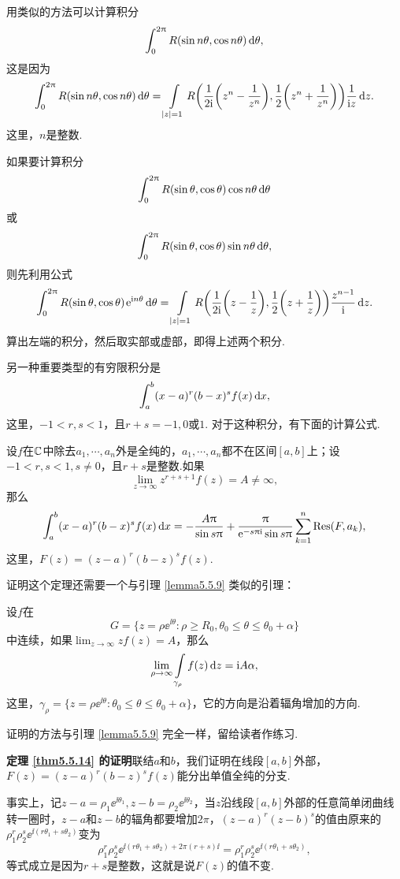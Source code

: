 用类似的方法可以计算积分
\[
  \int_0^{2\uppi}R(\sin n\theta,\cos n\theta)\mathop{}\!\mathrm{d} \theta,
\]
这是因为
\[
  \int_0^{2\uppi}R(\sin n\theta,\cos n\theta)\mathop{}\!\mathrm{d} \theta=
  \int\limits_{|z|=1}R\bigg(\frac1{2\mathrm i}\bigg(z^n-\frac1{z^n}\bigg),
  \frac12\bigg(z^n+\frac1{z^n}\bigg)\bigg)\frac1{\mathrm i z}\mathop{}\!\mathrm dz.
\]
这里，$n$是整数.

如果要计算积分
\[
  \int_0^{2\uppi}R(\sin \theta,\cos \theta)\cos n\theta\mathop{}\!\mathrm{d} \theta
\]
或
\[
  \int_0^{2\uppi}R(\sin \theta,\cos \theta)\sin n\theta\mathop{}\!\mathrm{d} \theta,
\]
则先利用公式
\begin{equation}\label{eq5.5.10}
  \int_0^{2\uppi}R(\sin\theta,\cos\theta)\operatorname{\!\!\;\mathrm e}^{\mathrm i n\theta}\mathop{}\!\mathrm{d} \theta =
  \int\limits_{|z|=1}R\bigg(\frac1{2\mathrm i}\bigg(z-\frac1z\bigg),
  \frac12\bigg(z+\frac1z\bigg)\bigg)\frac{z^{n-1}}{\mathrm i}\mathop{}\!\mathrm dz.
\end{equation}
算出左端的积分，然后取实部或虚部，即得上述两个积分.

另一种重要类型的有穷限积分是
\[
  \int_a^b(x-a)^r(b-x)^sf(x)\mathop{}\!\mathrm dx,
\]
这里，$-1<r,s<1$，且$r+s=-1,0$或$1$. 对于这种积分，有下面的计算公式.

\begin{theorem}\label{thm5.5.14}
  设$f$在$\mathbb C$中除去$a_1,\cdots,a_n$外是全纯的，$a_1,\cdots,a_n$都不在区间$[a,b]$上；设$-1<r,s<1,s\ne0$，且$r+s$是整数.如果
  \[
    \lim_{z\to\infty}z^{r+s+1}f(z) = A\ne\infty,
  \]
  那么
  \begin{equation}\label{eq5.5.11}
    \int_a^b(x-a)^r(b-x)^sf(x)\mathop{}\!\mathrm dx = -\frac{A\uppi}{\sin s\uppi}+\frac{\uppi}{\operatorname{\!\!\;\mathrm e}^{-s\uppi\mathrm i}\sin
    s\uppi}\sum_{k=1}^n\operatorname*{Res}(F,a_k),
  \end{equation}
  这里，$F(z)=(z-a)^r(b-z)^sf(z)$.
\end{theorem}

证明这个定理还需要一个与引理 \ref{lemma5.5.9} 类似的引理：
\begin{lemma}\label{lemma5.5.15}
  设$f$在
  \[
    G = \{z=\rho\ee^{\ii\theta}:\rho\ge R_0,\theta_0\le\theta\le\theta_0+\alpha\}
  \]
  中连续，如果$\lim_{z\to\infty}zf(z)=A$，那么
  \[
    \lim_{\rho\to\infty}\int\limits_{\gamma_\rho}f(z)\mathop{}\!\mathrm dz=\mathrm i A\alpha,
  \]
  这里，$\gamma_\rho=\{z=\rho\ee^{\ii\theta}:\theta_0\le\theta\le\theta_0+\alpha\}$，它的方向是沿着辐角增加的方向.
\end{lemma}

证明的方法与引理 \ref{lemma5.5.9} 完全一样，留给读者作练习.

\textbf{定理 \ref{thm5.5.14} 的证明}\quad 联结$a$和$b$，我们证明在线段$[a,b]$外部，$F(z)=(z-a)^r(b-z)^sf(z)$能分出单值全纯的分支.

事实上，记$z-a=\rho_1\ee^{\ii\theta_1},z-b=\rho_2\ee^{\ii\theta_2}$，当$z$沿线段$[a,b]$外部的任意简单闭曲线转一圈时，$z-a$和$z-b$的辐角都要增加$2\pi$，$(z-a)^r(z-b)^s$的值由原来的$\rho_1^r\rho_2^s\ee^{\ii(r\theta_1+s\theta_2)}$变为
\[
  \rho_1^r\rho_2^s\ee^{\ii(r\theta_1+s\theta_2)+2\pi(r+s)\ii} =
  \rho_1^r\rho_2^s\ee^{\ii(r\theta_1+s\theta_2)},
\]
等式成立是因为$r+s$是整数，这就是说$F(z)$的值不变.


